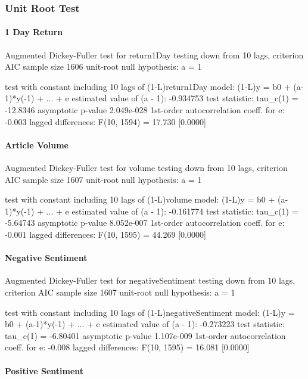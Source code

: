 \subsubsection{Unit Root Test}

\paragraph{1 Day Return}

Augmented Dickey-Fuller test for return1Day
testing down from 10 lags, criterion AIC
sample size 1606
unit-root null hypothesis: a = 1

test with constant 
including 10 lags of (1-L)return1Day
model: (1-L)y = b0 + (a-1)*y(-1) + ... + e
estimated value of (a - 1): -0.934753
test statistic: tau\_c(1) = -12.8346
asymptotic p-value 2.049e-028
1st-order autocorrelation coeff. for e: -0.003
lagged differences: F(10, 1594) = 17.730 [0.0000]

\paragraph{Article Volume}

Augmented Dickey-Fuller test for volume
testing down from 10 lags, criterion AIC
sample size 1607
unit-root null hypothesis: a = 1

test with constant 
including 10 lags of (1-L)volume
model: (1-L)y = b0 + (a-1)*y(-1) + ... + e
estimated value of (a - 1): -0.161774
test statistic: tau\_c(1) = -5.64743
asymptotic p-value 8.052e-007
1st-order autocorrelation coeff. for e: -0.001
lagged differences: F(10, 1595) = 44.269 [0.0000]

\paragraph{Negative Sentiment}

Augmented Dickey-Fuller test for negativeSentiment
testing down from 10 lags, criterion AIC
sample size 1607
unit-root null hypothesis: a = 1

test with constant 
including 10 lags of (1-L)negativeSentiment
model: (1-L)y = b0 + (a-1)*y(-1) + ... + e
estimated value of (a - 1): -0.273223
test statistic: tau\_c(1) = -6.80401
asymptotic p-value 1.107e-009
1st-order autocorrelation coeff. for e: -0.008
lagged differences: F(10, 1595) = 16.081 [0.0000]

\paragraph{Positive Sentiment}

